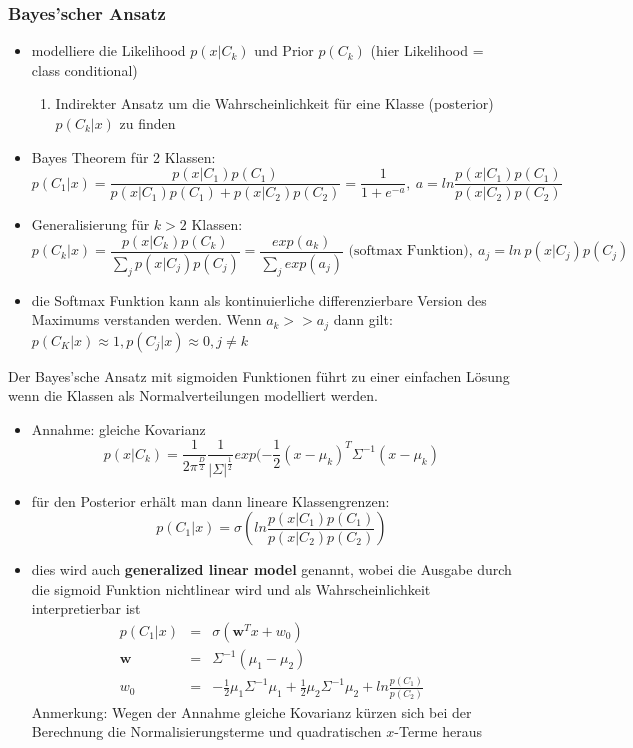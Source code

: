 	\subsubsection{Bayes'scher Ansatz}
	\begin{itemize}
		\item modelliere die Likelihood $p(x\vert C_k)$ und Prior $p(C_k)$ (hier Likelihood = class conditional)\vspace*{-3pt}
		\begin{enumerate}[$\hookrightarrow$]
			\item Indirekter Ansatz um die Wahrscheinlichkeit für eine Klasse (posterior) $p(C_k\vert x)$ zu finden
		\end{enumerate}
		\item Bayes Theorem für 2 Klassen:
		\begin{equation*}
			p(C_1\vert x) = \frac{p(x\vert C_1)p(C_1)}{p(x\vert C_1)p(C_1)+p(x\vert C_2)p(C_2)} = \frac{1}{1+e^{-a}}, ~a = ln\frac{p(x\vert C_1)p(C_1)}{p(x\vert C_2)p(C_2)}
		\end{equation*}
		\item Generalisierung für $k>2$ Klassen:
		\begin{equation*}
			p(C_k\vert x) = \frac{p(x\vert C_k)p(C_k)}{\sum_j p(x\vert C_j)p(C_j)} = \frac{exp(a_k)}{\sum_j exp(a_j)} \text{ (softmax Funktion)}, ~a_j = ln~p(x\vert C_j)p(C_j)
		\end{equation*}
		\item die Softmax Funktion kann als kontinuierliche differenzierbare Version des Maximums verstanden werden. Wenn $a_k >>a_j$ dann gilt: $p(C_K\vert x)\approx 1, p(C_j\vert x)\approx 0, j\ne k$
	\end{itemize}
	Der Bayes'sche Ansatz mit sigmoiden Funktionen führt zu einer einfachen Lösung wenn die Klassen als Normalverteilungen modelliert werden.
	\begin{itemize}
		\item Annahme: gleiche Kovarianz
		\begin{equation*}
			p(x\vert C_k) = \frac{1}{2\pi^{\frac{D}{2}}}\frac{1}{\vert\Sigma\vert^\frac{1}{2}}exp(-\frac{1}{2}(x-\mu_k)^T\Sigma^{-1}(x-\mu_k)
		\end{equation*}
		\item für den Posterior erhält man dann lineare Klassengrenzen:
		\begin{equation*}
			p(C_1\vert x) = \sigma(ln\frac{p(x\vert C_1)p(C_1)}{p(x\vert C_2)p(C_2)})
		\end{equation*}
		\item dies wird auch \textbf{generalized linear model} genannt, wobei die Ausgabe durch die sigmoid Funktion nichtlinear wird und als Wahrscheinlichkeit interpretierbar ist
		\begin{eqnarray*}
			p(C_1\vert x) &=& \sigma(\pmb{w}^Tx+w_0)\\
			\pmb{w} &=&\Sigma^{-1}(\mu_1-\mu_2)\\
			w_0 &=& -\frac{1}{2}\mu_1\Sigma^{-1}\mu_1+\frac{1}{2}\mu_2\Sigma^{-1}\mu_2+ln\frac{p(C_1)}{p(C_2)}
		\end{eqnarray*}
		Anmerkung: Wegen der Annahme gleiche Kovarianz kürzen sich bei der Berechnung die Normalisierungsterme und quadratischen $x$-Terme heraus
	\end{itemize}
